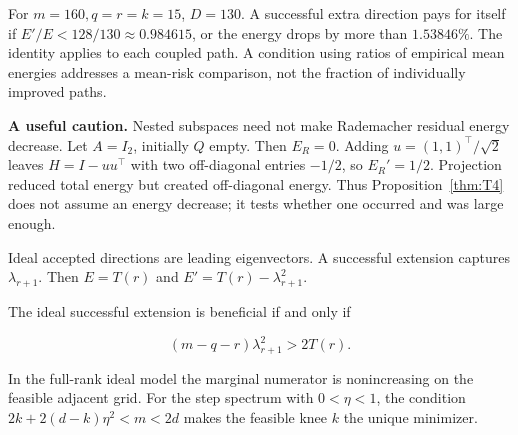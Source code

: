 For $m=160,q=r=k=15$, $D=130$. A successful extra direction pays for itself if $E'/E<128/130\approx0.984615$, or the energy drops by more than $1.53846\%$. The identity applies to each coupled path. A condition using ratios of empirical mean energies addresses a mean-risk comparison, not the fraction of individually improved paths.


\textbf{A useful caution.} Nested subspaces need not make Rademacher residual energy decrease. Let $A=I_2$, initially $Q$ empty. Then $E_R=0$. Adding $u=(1,1)^\top/\sqrt2$ leaves $H=I-uu^\top$ with two off-diagonal entries $-1/2$, so $E_R'=1/2$. Projection reduced total energy but created off-diagonal energy. Thus Proposition~\ref{thm:T4} does not assume an energy decrease; it tests whether one occurred and was large enough.

\begin{corollary}\label{cor:ideal}
Ideal accepted directions are leading eigenvectors. A successful extension captures $\lambda_{r+1}$. Then $E=T(r)$ and $E'=T(r)-\lambda_{r+1}^2$.


The ideal successful extension is beneficial if and only if


\begin{equation}
 (m-q-r)\lambda_{r+1}^2>2T(r). 
\end{equation}


In the full-rank ideal model the marginal numerator is nonincreasing on the
feasible adjacent grid. For the step spectrum with $0<\eta<1$, the condition
$2k+2(d-k)\eta^2<m<2d$ makes the feasible knee $k$ the unique minimizer.

\end{corollary}
